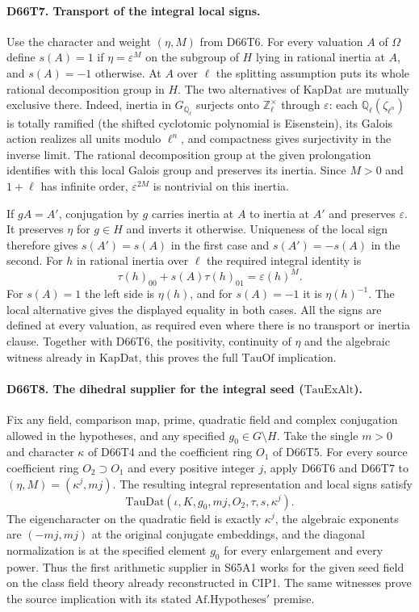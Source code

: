 \paragraph{D66T7. Transport of the integral local signs.}
Use the character and weight $(\eta,M)$ from D66T6.
For every valuation $A$ of $\Omega$ define $s(A)=1$ if
$\eta=\varepsilon^M$ on the subgroup of $H$ lying in rational
inertia at $A$, and $s(A)=-1$ otherwise. At $A$ over $\ell$ the
splitting assumption puts its whole rational decomposition group in
$H$. The two alternatives of $\mathrm{KapDat}$ are mutually
exclusive there. Indeed, inertia in $G_{\mathbb Q_\ell}$ surjects
onto $\mathbb Z_\ell^\times$ through $\varepsilon$: each
$\mathbb Q_\ell(\zeta_{\ell^n})$ is totally ramified
(the shifted cyclotomic polynomial is Eisenstein), its Galois
action realizes all units modulo $\ell^n$, and compactness gives
surjectivity in the inverse limit. The rational decomposition
group at the given prolongation identifies with this local Galois
group and preserves its inertia. Since $M>0$ and $1+\ell$ has
infinite order, $\varepsilon^{2M}$ is nontrivial on this inertia.

If $gA=A'$, conjugation by $g$ carries inertia at $A$ to inertia
at $A'$ and preserves $\varepsilon$. It preserves $\eta$ for
$g\in H$ and inverts it otherwise. Uniqueness of the local sign
therefore gives $s(A')=s(A)$ in the first case and $s(A')=-s(A)$
in the second. For $h$ in rational inertia over $\ell$ the
required integral identity is
\[
                  \tau(h)_{00}+s(A)\tau(h)_{01}
                         =\varepsilon(h)^M .
\]
For $s(A)=1$ the left side is $\eta(h)$, and for $s(A)=-1$ it is
$\eta(h)^{-1}$. The local alternative gives the displayed equality
in both cases. All the signs are defined at every valuation, as
required even where there is no transport or inertia clause.
Together with D66T6, the positivity, continuity of $\eta$ and
the algebraic witness already in $\mathrm{KapDat}$, this proves
the full $\mathrm{TauOf}$ implication.

\paragraph{D66T8. The dihedral supplier for the integral seed ($\mathrm{TauExAlt}$).}
Fix any field, comparison map, prime, quadratic field and
complex conjugation allowed in the hypotheses, and any specified
$g_0\in G\setminus H$. Take the single $m>0$ and character
$\kappa$ of D66T4 and the coefficient ring $O_1$ of D66T5.
For every source coefficient ring $O_2\supset O_1$ and every
positive integer $j$, apply D66T6 and D66T7 to
$(\eta,M)=(\kappa^j,mj)$. The resulting integral representation
and local signs satisfy
\[
              \mathrm{TauDat}(\iota,K,g_0,mj,O_2,\tau,s,\kappa^j).
\]
The eigencharacter on the quadratic field is exactly $\kappa^j$,
the algebraic exponents are $(-mj,mj)$ at the original conjugate
embeddings, and the diagonal normalization is at the specified
element $g_0$ for every enlargement and every power. Thus the first arithmetic supplier in S65A1 works for the
given seed field on the class field theory already reconstructed
in CIP1. The same witnesses prove the source implication with
its stated $\mathrm{Af.Hypotheses}'$ premise.
